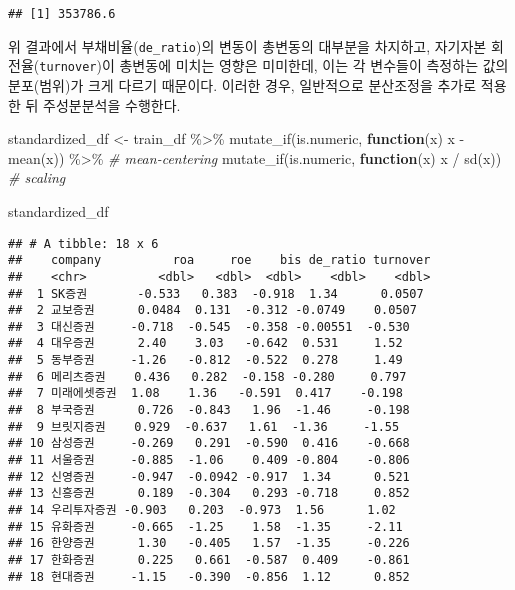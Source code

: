 \documentclass[
]{book}
\newenvironment{Shaded}{\begin{snugshade}}{\end{snugshade}}
\newcommand{\CommentTok}[1]{\textcolor[rgb]{0.56,0.35,0.01}{\textit{#1}}}
\newcommand{\ControlFlowTok}[1]{\textcolor[rgb]{0.13,0.29,0.53}{\textbf{#1}}}
\newcommand{\FunctionTok}[1]{\textcolor[rgb]{0.00,0.00,0.00}{#1}}
\newcommand{\NormalTok}[1]{#1}
\newcommand{\OtherTok}[1]{\textcolor[rgb]{0.56,0.35,0.01}{#1}}
\newcommand{\SpecialCharTok}[1]{\textcolor[rgb]{0.00,0.00,0.00}{#1}}
\begin{document}
\begin{verbatim}
## [1] 353786.6
\end{verbatim}

위 결과에서 부채비율(\texttt{de\_ratio})의 변동이 총변동의 대부분을 차지하고, 자기자본 회전율(\texttt{turnover})이 총변동에 미치는 영향은 미미한데, 이는 각 변수들이 측정하는 값의 분포(범위)가 크게 다르기 때문이다. 이러한 경우, 일반적으로 분산조정을 추가로 적용한 뒤 주성분분석을 수행한다.

\begin{Shaded}
\begin{Highlighting}[]
\NormalTok{standardized\_df }\OtherTok{\textless{}{-}}\NormalTok{ train\_df }\SpecialCharTok{\%\textgreater{}\%}
  \FunctionTok{mutate\_if}\NormalTok{(is.numeric, }\ControlFlowTok{function}\NormalTok{(x) x }\SpecialCharTok{{-}} \FunctionTok{mean}\NormalTok{(x)) }\SpecialCharTok{\%\textgreater{}\%}  \CommentTok{\# mean{-}centering}
  \FunctionTok{mutate\_if}\NormalTok{(is.numeric, }\ControlFlowTok{function}\NormalTok{(x) x }\SpecialCharTok{/} \FunctionTok{sd}\NormalTok{(x))  }\CommentTok{\# scaling}
\end{Highlighting}
\end{Shaded}

\begin{Shaded}
\begin{Highlighting}[]
\NormalTok{standardized\_df}
\end{Highlighting}
\end{Shaded}

\begin{verbatim}
## # A tibble: 18 x 6
##    company          roa     roe    bis de_ratio turnover
##    <chr>          <dbl>   <dbl>  <dbl>    <dbl>    <dbl>
##  1 SK증권       -0.533   0.383  -0.918  1.34      0.0507
##  2 교보증권      0.0484  0.131  -0.312 -0.0749    0.0507
##  3 대신증권     -0.718  -0.545  -0.358 -0.00551  -0.530 
##  4 대우증권      2.40    3.03   -0.642  0.531     1.52  
##  5 동부증권     -1.26   -0.812  -0.522  0.278     1.49  
##  6 메리츠증권    0.436   0.282  -0.158 -0.280     0.797 
##  7 미래에셋증권  1.08    1.36   -0.591  0.417    -0.198 
##  8 부국증권      0.726  -0.843   1.96  -1.46     -0.198 
##  9 브릿지증권    0.929  -0.637   1.61  -1.36     -1.55  
## 10 삼성증권     -0.269   0.291  -0.590  0.416    -0.668 
## 11 서울증권     -0.885  -1.06    0.409 -0.804    -0.806 
## 12 신영증권     -0.947  -0.0942 -0.917  1.34      0.521 
## 13 신흥증권      0.189  -0.304   0.293 -0.718     0.852 
## 14 우리투자증권 -0.903   0.203  -0.973  1.56      1.02  
## 15 유화증권     -0.665  -1.25    1.58  -1.35     -2.11  
## 16 한양증권      1.30   -0.405   1.57  -1.35     -0.226 
## 17 한화증권      0.225   0.661  -0.587  0.409    -0.861 
## 18 현대증권     -1.15   -0.390  -0.856  1.12      0.852
\end{verbatim}
\end{document}
